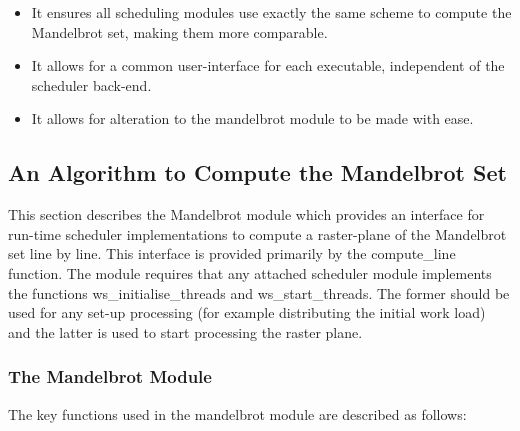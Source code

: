 \begin{itemize}
\item It ensures all scheduling modules use exactly the same scheme to compute the Mandelbrot set, making them more comparable.
\item It allows for a common user-interface for each executable, independent of the scheduler back-end.
\item It allows for alteration to the mandelbrot module to be made with ease.
\end{itemize}



\subsection{An Algorithm to Compute the Mandelbrot Set}
\label{sec:mandmod}

This section describes the Mandelbrot module which provides an interface for run-time scheduler implementations to 
compute a raster-plane of the Mandelbrot set line by line. 
This interface is provided primarily by the compute\_line function. 
The module requires that any attached scheduler module implements the functions
ws\_initialise\_threads and ws\_start\_threads. 
The former should be used for any set-up processing (for example distributing the initial 
work load) and the latter is used to start processing the raster plane.

\subsubsection*{The Mandelbrot Module}

The key functions used in the mandelbrot module are described as follows:

